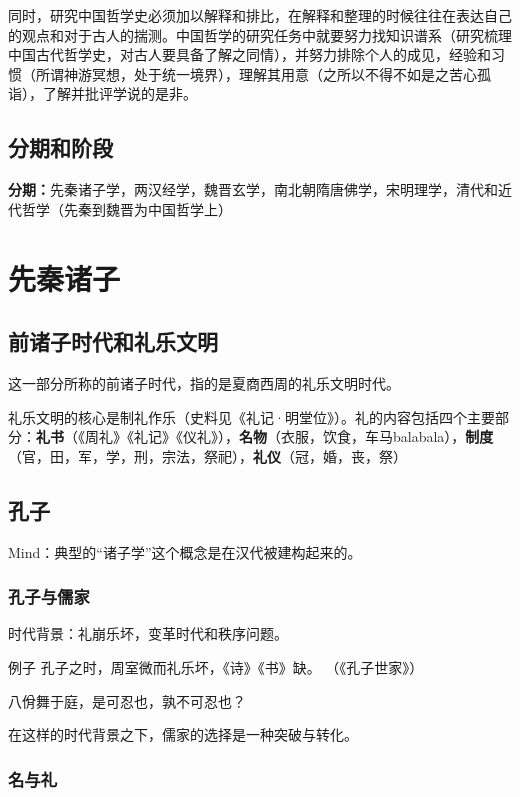 \documentclass{ctexart}
\begin{document}
同时，研究中国哲学史必须加以解释和排比，在解释和整理的时候往往在表达自己的观点和对于古人的揣测。中国哲学的研究任务中就要努力找知识谱系（研究梳理中国古代哲学史，对古人要具备了解之同情），并努力排除个人的成见，经验和习惯（所谓神游冥想，处于统一境界），理解其用意（之所以不得不如是之苦心孤诣），了解并批评学说的是非。

\subsection{分期和阶段}

\textbf{分期：}先秦诸子学，两汉经学，魏晋玄学，南北朝隋唐佛学，宋明理学，清代和近代哲学（先秦到魏晋为中国哲学上）

\section{先秦诸子}

\subsection{前诸子时代和礼乐文明}
这一部分所称的前诸子时代，指的是夏商西周的礼乐文明时代。

礼乐文明的核心是制礼作乐（史料见《礼记·明堂位》）。礼的内容包括四个主要部分：\textbf{礼书}（《周礼》《礼记》《仪礼》），\textbf{名物}（衣服，饮食，车马balabala），\textbf{制度}（官，田，军，学，刑，宗法，祭祀），\textbf{礼仪}（冠，婚，丧，祭）

\subsection{孔子}

Mind：典型的“诸子学”这个概念是在汉代被建构起来的。

\subsubsection{孔子与儒家}

时代背景：礼崩乐坏，变革时代和秩序问题。

\begin{fancybox}{例子}
    孔子之时，周室微而礼乐坏，《诗》《书》缺。 （《孔子世家》）
    
    八佾舞于庭，是可忍也，孰不可忍也？
\end{fancybox}

在这样的时代背景之下，儒家的选择是一种突破与转化。

\subsubsection{名与礼}
\end{document}
